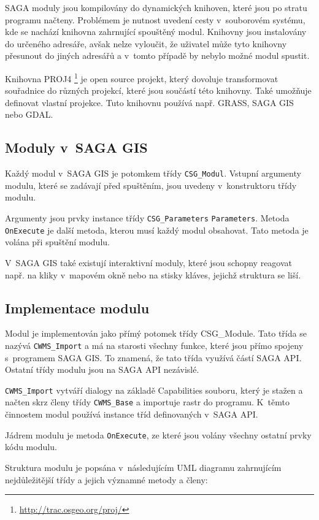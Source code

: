 \documentclass[a4paper,12pt]{article}
\begin{document}
SAGA moduly jsou kompilovány do dynamických knihoven, které jsou po stratu 
programu načteny. Problémem je nutnost uvedení
cesty v~souborovém systému, kde se nachází knihovna zahrnující 
spouštěný modul. Knihovny jsou instalovány do určeného adresáře, avšak 
nelze vyloučit, že uživatel může tyto knihovny přesunout do jiných
 adresářů a v~tomto případě by nebylo možné modul spustit. 

Knihovna PROJ4 \footnote{\url{http://trac.osgeo.org/proj/}} je open source
projekt, který dovoluje transformovat souřadnice do různých projekcí,
které jsou součástí této knihovny. Také umožňuje definovat vlastní
projekce. Tuto knihovnu používá např. GRASS, SAGA GIS nebo GDAL.

\subsection{Moduly v~SAGA GIS}

Každý modul v~SAGA GIS je potomkem třídy {\tt CSG\_Modul}. Vstupní argumenty
modulu, které se zadávají před spuštěním, jsou uvedeny v~konstruktoru
třídy modulu.

Argumenty jsou prvky instance třídy {\tt CSG\_Parameters} {\tt Parameters}.
Metoda {\tt OnExecute} je další metoda, kterou musí každý modul
obsahovat. Tato metoda je volána při spuštění modulu.

V~SAGA GIS také existují interaktivní moduly, které jsou schopny
reagovat např. na kliky v~mapovém okně nebo na stisky kláves, jejichž
struktura se liší.


\subsection{Implementace modulu}
Modul je implementován jako přímý potomek třídy CSG\_Module. Tato
třída se nazývá {\tt CWMS\_Import} a má na starosti všechny funkce, které
jsou přímo spojeny s~programem SAGA GIS. To znamená, že tato třída 
využívá částí SAGA API. Ostatní třídy modulu jsou na SAGA API nezávislé. 
 

{\tt CWMS\_Import} vytváří dialogy na základě Capabilities souboru, který je
stažen a načten skrz členy třídy {\tt CWMS\_Base} a importuje rastr do
programu. K~těmto činnostem modul používá instance tříd definovaných
v~SAGA API. 

Jádrem modulu je metoda {\tt OnExecute}, ze které jsou volány všechny 
ostatní prvky kódu modulu.

Struktura modulu je popsána v~následujícím UML diagramu 
zahrnujícím nejdůležitější třídy a jejich významné metody a členy:
\end{document}
